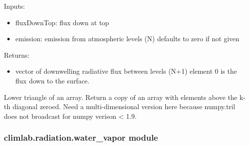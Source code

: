 \documentclass[letterpaper,10pt,english]{sphinxmanual}
\begin{document}
\begin{fulllineitems}
\begin{fulllineitems}
Inputs:
\begin{itemize}
\item {} 
fluxDownTop: flux down at top

\item {} 
emission: emission from atmospheric levels (N)
defaults to zero if not given

\end{itemize}

Returns:
\begin{itemize}
\item {} 
vector of downwelling radiative flux between levels (N+1)
element 0 is the flux down to the surface.

\end{itemize}

\end{fulllineitems}


\end{fulllineitems}


\begin{fulllineitems}
\label{api/climlab.radiation:climlab.radiation.transmissivity.compute_T_vectorized}
\end{fulllineitems}


\begin{fulllineitems}
\label{api/climlab.radiation:climlab.radiation.transmissivity.tril}
Lower triangle of an array.
Return a copy of an array with elements above the k-th diagonal zeroed.
Need a multi-dimensional version here because numpy.tril does not
broadcast for numpy verison \textless{} 1.9.

\end{fulllineitems}



\subsubsection{climlab.radiation.water\_vapor module}
\label{api/climlab.radiation:module-climlab.radiation.water_vapor}\label{api/climlab.radiation:climlab-radiation-water-vapor-module}
\end{document}
